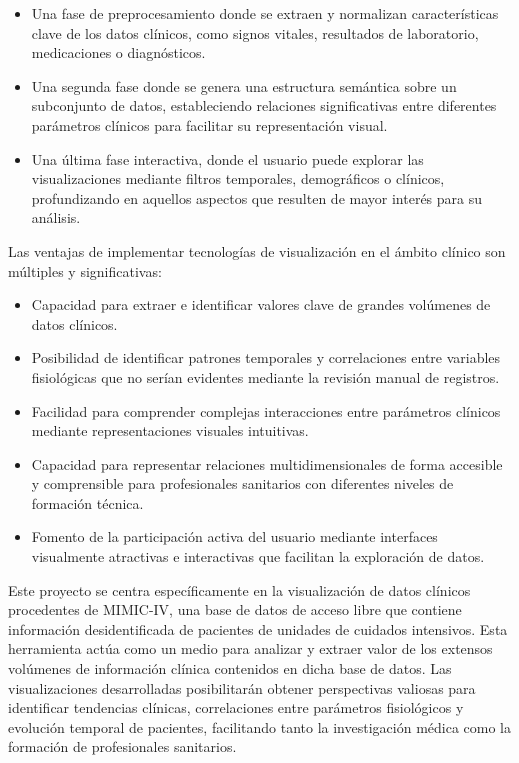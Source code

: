 \begin{itemize}
    \item Una fase de preprocesamiento donde se extraen y normalizan características clave de los datos clínicos, como signos vitales, resultados de laboratorio, medicaciones o diagnósticos.
    
    \item Una segunda fase donde se genera una estructura semántica sobre un subconjunto de datos, estableciendo relaciones significativas entre diferentes parámetros clínicos para facilitar su representación visual.
    
    \item Una última fase interactiva, donde el usuario puede explorar las visualizaciones mediante filtros temporales, demográficos o clínicos, profundizando en aquellos aspectos que resulten de mayor interés para su análisis.
\end{itemize}

Las ventajas de implementar tecnologías de visualización en el ámbito clínico son múltiples y significativas:

\begin{itemize}
    \item Capacidad para extraer e identificar valores clave de grandes volúmenes de datos clínicos.
    
    \item Posibilidad de identificar patrones temporales y correlaciones entre variables fisiológicas que no serían evidentes mediante la revisión manual de registros.
    
    \item Facilidad para comprender complejas interacciones entre parámetros clínicos mediante representaciones visuales intuitivas.
    
    \item Capacidad para representar relaciones multidimensionales de forma accesible y comprensible para profesionales sanitarios con diferentes niveles de formación técnica.
    
    \item Fomento de la participación activa del usuario mediante interfaces visualmente atractivas e interactivas que facilitan la exploración de datos.
\end{itemize}

Este proyecto se centra específicamente en la visualización de datos clínicos procedentes de MIMIC-IV, una base de datos de acceso libre que contiene información desidentificada de pacientes de unidades de cuidados intensivos. Esta herramienta actúa como un medio para analizar y extraer valor de los extensos volúmenes de información clínica contenidos en dicha base de datos. Las visualizaciones desarrolladas posibilitarán obtener perspectivas valiosas para identificar tendencias clínicas, correlaciones entre parámetros fisiológicos y evolución temporal de pacientes, facilitando tanto la investigación médica como la formación de profesionales sanitarios.

